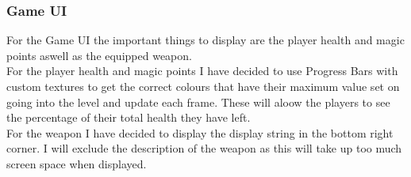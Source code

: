 \documentclass{article}
\begin{document}
        \subsubsection{Game UI}
        For the Game UI the important things to display are the player health and magic points aswell as the equipped weapon.\\
        For the player health and magic points I have decided to use Progress Bars with custom textures to get the correct colours that have their maximum value set on going into the level and update each frame. These will aloow the players to see the percentage of their total health they have left.\\
        For the weapon I have decided to display the display string in the bottom right corner. I will exclude the description of the weapon as this will take up too much screen space when displayed.\\
\end{document}
